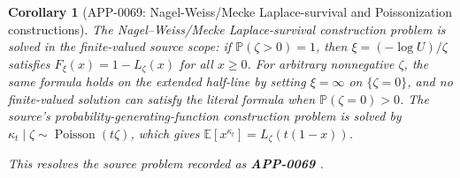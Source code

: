 \documentclass[11pt]{article}
\numberwithin{equation}{section}
\newtheorem{corollary}[theorem]{Corollary}
\theoremstyle{definition}
\theoremstyle{remark}
\newcommand{\1}{\mathbf 1}
\begin{document}
\begin{corollary}[APP-0069: Nagel-Weiss/Mecke Laplace-survival and Poissonization constructions]
\label{res:nagelweissmecke-laplacesurvival-poissonization-solution}
The Nagel--Weiss/Mecke Laplace-survival construction problem is solved in the finite-valued source scope: if \(\mathbb P(\zeta>0)=1\), then \(\xi=(-\log U)/\zeta\) satisfies \(F_\xi(x)=1-L_\zeta(x)\) for all \(x\ge0\). For arbitrary nonnegative \(\zeta\), the same formula holds on the extended half-line by setting \(\xi=\infty\) on \(\{\zeta=0\}\), and no finite-valued solution can satisfy the literal formula when \(\mathbb P(\zeta=0)>0\). The source's probability-generating-function construction problem is solved by \(\kappa_t\mid\zeta\sim\operatorname{Poisson}(t\zeta)\), which gives \(\mathbb E[x^{\kappa_t}]=L_\zeta(t(1-x))\).



This resolves the source problem recorded as \textbf{APP-0069} \cite{app-app-0069-source}.
\end{corollary}
\end{document}
